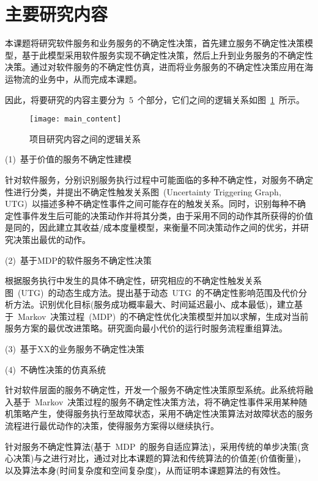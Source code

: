 \section{主要研究内容}

本课题将研究软件服务和业务服务的不确定性决策，首先建立服务不确定性决策模型，基于此模型采用软件服务实现不确定性决策，然后上升到业务服务的不确定性决策。通过对软件服务的不确定性仿真，进而将业务服务的不确定性决策应用在海运物流的业务中，从而完成本课题。

因此，将要研究的内容主要分为~5~个部分，它们之间的逻辑关系如图~\ref{main_content}~所示。

\begin{figure}[htbp]
    \centering
    \texttt{[image: main\_content]}
    \caption{项目研究内容之间的逻辑关系}\label{main_content}
    \vspace{-1em}
\end{figure}

(1)~基于价值的服务不确定性建模

针对软件服务，分别识别服务执行过程中可能面临的多种不确定性，对服务不确定性进行分类，并提出不确定性触发关系图~(Uncertainty Triggering Graph, UTG)~以描述多种不确定性事件之间可能存在的触发关系。同时，识别每种不确定性事件发生后可能的决策动作并将其分类，由于采用不同的动作其所获得的价值是同的，因此建立其收益/成本度量模型，来衡量不同决策动作之间的优劣，并研究决策出最优的动作。

(2)~基于MDP的软件服务不确定性决策

根据服务执行中发生的具体不确定性，研究相应的不确定性触发关系图~(UTG)~的动态生成方法。提出基于动态~UTG~的不确定性影响范围及代价分析方法。识别优化目标(服务成功概率最大、时间延迟最小、成本最低)，建立基于~Markov~决策过程~(MDP)~的不确定性优化决策模型并加以求解，生成对当前服务方案的最优改进策略。研究面向最小代价的运行时服务流程重组算法。

(3)~基于XX的业务服务不确定性决策



(4)~不确性决策的仿真系统

针对软件层面的服务不确定性，开发一个服务不确定性决策原型系统。此系统将融入基于~Markov~决策过程的服务不确定性决策方法，将不确定性事件采用某种随机策略产生，使得服务执行至故障状态，采用不确定性决策算法对故障状态的服务流程进行最优动作的决策，使得服务方案得以继续执行。

针对服务不确定性算法(基于~MDP~的服务自适应算法)，采用传统的单步决策(贪心决策)与之进行对比，通过对比本课题的算法和传统算法的价值差(价值衡量)，以及算法本身(时间复杂度和空间复杂度)，从而证明本课题算法的有效性。

